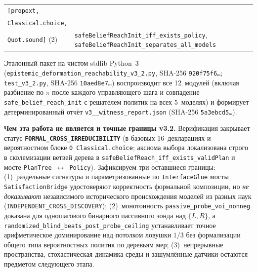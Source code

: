 \documentclass[10pt,a4paper]{article}
\theoremstyle{cleanthm}
\theoremstyle{cleandef}
\newcommand{\callout}[2]{%
  \vspace{5pt}\noindent\colorbox{boxbg}{%
    \parbox{\dimexpr\linewidth-2\fboxsep\relax}{%
      \vspace{3pt}\textbf{\color{accent}#1.}\hspace{0.4em}#2\vspace{3pt}%
    }%
  }\vspace{5pt}%
}
\begin{document}
\begin{table}[!htbp]
\begin{tabularx}{\linewidth}{@{}>{\raggedright\arraybackslash}p{45mm} >{\raggedright\arraybackslash}X@{}}
\texttt{[propext,}\\\texttt{Classical.choice,}\\\texttt{Quot.sound]} (2) & \texttt{safeBeliefReachInit\_\allowbreak iff\_\allowbreak exists\_\allowbreak policy}, \texttt{safeBeliefReachInit\_\allowbreak separates\_\allowbreak all\_\allowbreak models} \\
\bottomrule
\end{tabularx}
\end{table}

Эталонный пакет на чистом stdlib Python~3 (\texttt{epistemic\_\allowbreak deformation\_\allowbreak reachability\_\allowbreak v3\_\allowbreak 2.py}, SHA-256 \texttt{920f75f6\ldots}; \texttt{test\_\allowbreak v3\_\allowbreak 2.py}, SHA-256 \texttt{10aed8e7\ldots}) воспроизводит все 12~модулей (включая разбиение по $\pi$ после каждого управляющего шага и совпадение \texttt{safe\_\allowbreak belief\_\allowbreak reach\_\allowbreak init} с решателем политик на всех 5~моделях) и формирует детерминированный отчёт \texttt{v3\_\_\allowbreak witness\_\allowbreak report.json} (SHA-256 \texttt{5a3ebcd5\ldots}).

\callout{Чем эта работа не является и точные границы v3.2}{%
Верификация закрывает статус \textbf{\texttt{FORMAL\_\allowbreak CROSS\_\allowbreak IRREDUCIBILITY}} (в базовых 16~декларациях и вероятностном блоке \texttt{0 Classical.choice}; аксиома выбора локализована строго в сколемизации ветвей дерева в \texttt{safeBeliefReach\_\allowbreak iff\_\allowbreak exists\_\allowbreak validPlan} и мосте \texttt{PlanTree}~$\leftrightarrow$~\texttt{Policy}). Зафиксируем три оставшиеся границы: (1)~раздельные сигнатуры и параметризованные по \texttt{InterfaceGlue} мосты \texttt{Satisfaction\allowbreak Bridge} удостоверяют корректность формальной композиции, но \emph{не доказывают} независимого исторического происхождения моделей из разных наук (\texttt{INDEPENDENT\_\allowbreak CROSS\_\allowbreak DISCOVERY}); (2)~монотонность \texttt{passive\_\allowbreak probe\_\allowbreak voi\_\allowbreak nonneg} доказана для одношагового бинарного пассивного зонда над $\{L,R\}$, а \texttt{randomized\_\allowbreak blind\_\allowbreak beats\_\allowbreak post\_\allowbreak probe\_\allowbreak ceiling} устанавливает точное арифметическое доминирование над потолком ловушки $1/3$ без формализации общего типа вероятностных политик по деревьям мер; (3)~непрерывные пространства, стохастическая динамика среды и зашумлённые датчики остаются предметом следующего этапа.}
\end{document}
